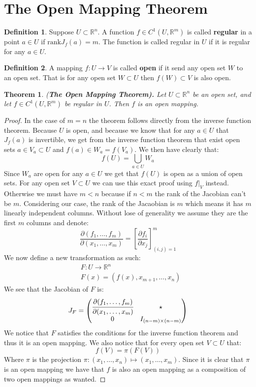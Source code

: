 \documentclass[11pt,a4paper]{article}
\theoremstyle{definition}
\newtheorem{definition}{Definition}[section]
\theoremstyle{plain}
\newtheorem{theorem}{Theorem}[section]
\newcommand{\R}{\mathbb{R}}
\begin{document}
	\section{The Open Mapping Theorem}
	\begin{definition}
		Suppose $U \subset \R^n$. A function $f \in C^1(U, \R^m)$ is called 
		\textbf{regular} in a point $a \in U$ if $\mathrm{rank}J_f(a) = m$.
		The function is called regular in $U$ if it is regular for any
		$a \in U$.
	\end{definition}
	\begin{definition}
		A mapping $f \colon U \to V$ is called \textbf{open} if it send
		any open set $W$ to an open set. That is for any open set 
		$W \subset U$ then $f(W) \subset V$ is also open.
	\end{definition}
	\begin{theorem}
		\textnormal{(\textbf{The Open Mapping Theorem).}} Let $U \subset \R^n$ 
		be an open set, and let $f \in C^1(U,\R^m)$ be regular in $U$. 
		Then $f$ is an open mapping.
	\end{theorem}
	\begin{proof}
		In the case of $m = n$ the theorem follows directly from the inverse
		function theorem. Because $U$ is open, and because we know that
		for any $a \in U$ that $J_f(a)$ is invertible, we get from the
		inverse function theorem that exist open sets $a \in V_a \subset U$ 
		and $f(a) \in W_a = f(V_a)$. We then have clearly that:
		\[
			f(U) = \bigcup_{a \in U} W_a
		\]
		Since $W_a$ are open for any $a \in U$ we get that $f(U)$ is open
		as a union of open sets. For any open set $V \subset U$ we can
		use this exact proof using $f\vert_V$ instead. \\
		Otherwise we must have $m < n$ because if $n < m$ the rank of the
		Jacobian can't be $m$. Considering our case, the rank of the Jacaobian
		is $m$ which means it has $m$ linearly independent columns. Without
		lose of generality we assume they are the first $m$ columns and 
		denote:
		\[
			\frac{\partial(f_1,\dots,f_m)}{\partial(x_1,\dots,x_m)} = 
			\left[\frac{\partial f_i}{\partial x_j}\right]_{(i,j)=1}^{m}
		\]
		We now define a new transformation as such:
		\begin{align*}
			&F \colon U \to \R^n \\
			&F(x) = (f(x),x_{m+1},\dots,x_{n})
		\end{align*}
		We see that the Jacobian of $F$ is:
		\[
			J_F = \begin{pmatrix}
	\cfrac{\partial(f_1,\dots,f_m)}{\partial(x_1,\dots,x_m)} & \star \\
	0 & I_{(n-m) \times (n-m)}\\
				\end{pmatrix}
		\]
		We notice that $F$ satisfies the conditions for the inverse function
		theorem and thus it is an open mapping. We also notice that for
		every open set $V \subset U$ that:
		\[
			f(V) = \pi(F(V))
		\]
		Where $\pi$ is the projection 
		$\pi \colon (x_1,\dots,x_n) \mapsto (x_1,\dots,x_m)$. Since
		it is clear that $\pi$ is an open mapping we have that $f$
		is also an open mapping as a composition of two open mappings as
		wanted.
	\end{proof}
	
\end{document}
